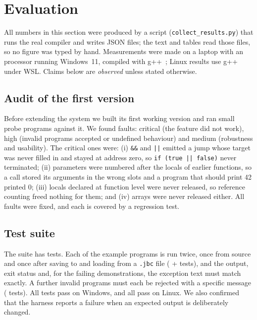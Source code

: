 \documentclass[conference]{IEEEtran}
\begin{document}
\section{Evaluation}
\label{sec:eval}
All numbers in this section were produced by a script (\texttt{collect\_results.py}) that runs the real compiler
and writes JSON files; the text and tables read those files, so no figure was typed by hand. Measurements were made
on a laptop with an  processor running Windows~11, compiled with g++~; Linux results use
g++~ under WSL. Claims below are \emph{observed} unless stated otherwise.

\subsection{Audit of the first version}
Before extending the system we built its first working version and ran small probe programs against it. We found
 faults:  critical (the feature did not work),  high
(invalid programs accepted or undefined behaviour) and  medium (robustness and usability).
The critical ones were: (i) \texttt{\&\&} and \texttt{||} emitted a jump whose target was never filled in and stayed
at address zero, so \texttt{if (true || false)} never terminated; (ii) parameters were numbered after the locals of
earlier functions, so a call stored its arguments in the wrong slots and a program that should print 42 printed
0; (iii) locals declared at function level were never released, so reference counting freed nothing for them; and
(iv) arrays were never released either. All faults were fixed, and each is covered by a regression test.

\subsection{Test suite}
The suite has  tests. Each of the  example programs is run twice, once from
source and once after saving to and loading from a \texttt{.jbc} file ( + 
tests), and the output, exit status and, for the failing demonstrations, the exception text must match exactly.
A further  invalid programs must each be rejected with a specific message
( tests). All  tests pass on Windows, and all  pass on Linux.
We also confirmed that the harness reports a failure when an expected output is deliberately changed.
\end{document}

